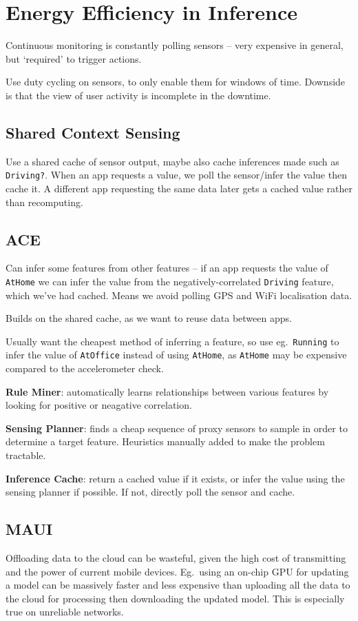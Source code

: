 \documentclass[a4paper, 11pt]{article}
\begin{document}
\section*{Energy Efficiency in Inference}
{
    Continuous monitoring is constantly polling sensors -- very expensive in general, but `required' to trigger actions.

    Use duty cycling on sensors, to only enable them for windows of time. Downside is that the view of user activity is incomplete in the downtime.

    \subsection*{Shared Context Sensing}
    {
        Use a shared cache of sensor output, maybe also cache inferences made such as \texttt{Driving?}. When an app requests a value, we poll the sensor/infer the value then cache it. A different app requesting the same data later gets a cached value rather than recomputing.
    }
    \subsection*{ACE}
    {
        Can infer some features from other features -- if an app requests the value of \texttt{AtHome} we can infer the value from the negatively-correlated \texttt{Driving} feature, which we've had cached. Means we avoid polling GPS and WiFi localisation data.

        Builds on the shared cache, as we want to reuse data between apps.

        Usually want the cheapest method of inferring a feature, so use eg.\ \texttt{Running} to infer the value of \texttt{AtOffice} instead of using \texttt{AtHome}, as \texttt{AtHome} may be expensive compared to the accelerometer check.

        \textbf{Rule Miner}: automatically learns relationships between various features by looking for positive or neagative correlation.

        \textbf{Sensing Planner}: finds a cheap sequence of proxy sensors to sample in order to determine a target feature. Heuristics manually added to make the problem tractable.

        \textbf{Inference Cache}: return a cached value if it exists, or infer the value using the sensing planner if possible. If not, directly poll the sensor and cache.
    }
    \subsection*{MAUI}
    {
        Offloading data to the cloud can be wasteful, given the high cost of transmitting and the power of current mobile devices. Eg.\ using an on-chip GPU for updating a model can be massively faster and less expensive than uploading all the data to the cloud for processing then downloading the updated model. This is especially true on unreliable networks.

}}
\end{document}
